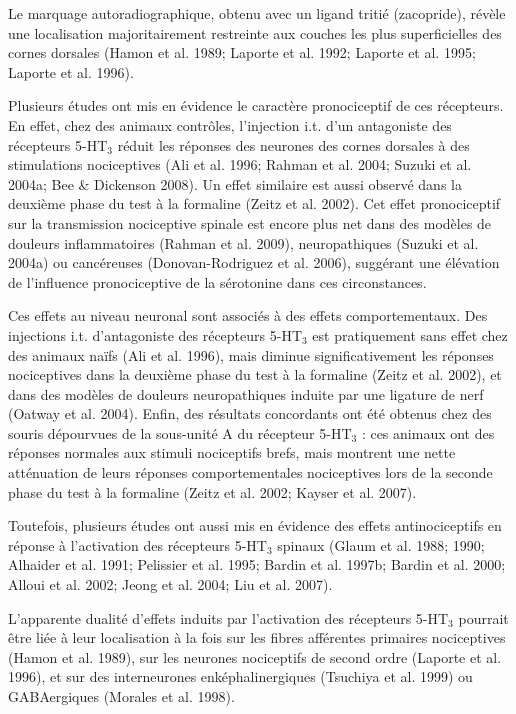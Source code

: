 \documentclass[a4paper,12pt,twoside]{report}
\begin{document}
Le marquage autoradiographique, obtenu avec un ligand tritié (zacopride), révèle une localisation majoritairement restreinte aux couches les plus superficielles des cornes dorsales (Hamon et al. 1989; Laporte et al. 1992; Laporte et al. 1995; Laporte et al. 1996).

Plusieurs études ont mis en évidence le caractère pronociceptif de ces récepteurs. En effet, chez des animaux contrôles, l’injection i.t. d’un antagoniste des récepteurs 5-HT$_{3}$ réduit les réponses des neurones des cornes dorsales à des stimulations nociceptives (Ali et al. 1996; Rahman et al. 2004; Suzuki et al. 2004a; Bee \& Dickenson 2008). Un effet similaire est aussi observé dans la deuxième phase du test à la formaline (Zeitz et al. 2002). Cet effet pronociceptif sur la transmission nociceptive spinale est encore plus net dans des modèles de douleurs inflammatoires (Rahman et al. 2009), neuropathiques (Suzuki et al. 2004a) ou cancéreuses (Donovan-Rodriguez et al. 2006), suggérant une élévation de l’influence pronociceptive de la sérotonine dans ces circonstances.

Ces effets au niveau neuronal sont associés à des effets comportementaux. Des injections i.t. d’antagoniste des récepteurs 5-HT$_{3}$ est pratiquement sans effet chez des animaux naïfs (Ali et al. 1996), mais diminue significativement les réponses nociceptives dans la deuxième phase du test à la formaline (Zeitz et al. 2002), et dans des modèles de douleurs neuropathiques induite par une ligature de nerf (Oatway et al. 2004). Enfin, des résultats concordants ont été obtenus chez des souris dépourvues de la sous-unité A du récepteur 5-HT$_{3}$ : ces animaux ont des réponses normales aux stimuli nociceptifs brefs, mais montrent une nette atténuation de leurs réponses comportementales nociceptives lors de la seconde phase du test à la formaline (Zeitz et al. 2002; Kayser et al. 2007).

Toutefois, plusieurs études ont aussi mis en évidence des effets antinociceptifs en réponse à l’activation des récepteurs 5-HT$_{3}$ spinaux (Glaum et al. 1988; 1990; Alhaider et al. 1991; Pelissier et al. 1995; Bardin et al. 1997b; Bardin et al. 2000; Alloui et al. 2002; Jeong et al. 2004; Liu et al. 2007).

L’apparente dualité d’effets induits par l’activation des récepteurs 5-HT$_{3}$ pourrait être liée à leur localisation à la fois sur les fibres afférentes primaires nociceptives (Hamon et al. 1989), sur les neurones nociceptifs de second ordre (Laporte et al. 1996), et sur des interneurones enképhalinergiques (Tsuchiya et al. 1999) ou GABAergiques (Morales et al. 1998).
\end{document}
